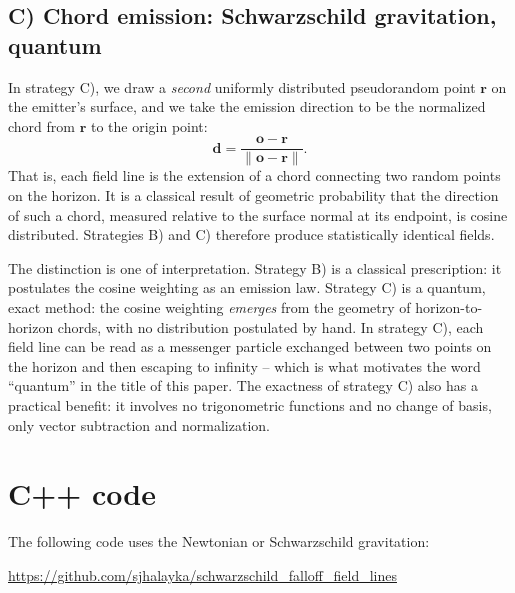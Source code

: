 \documentclass[10pt]{article}
\begin{document}
\subsection{C) Chord emission: Schwarzschild gravitation, quantum}

In strategy C), we draw a {\em second} uniformly distributed pseudorandom point $\mathbf{r}$ on the emitter's surface, and we take the emission direction to be the normalized chord from $\mathbf{r}$ to the origin point:
\begin{equation}
\mathbf{d} = \frac{\mathbf{o} - \mathbf{r}}{\lVert \mathbf{o} - \mathbf{r} \rVert}.
\end{equation}
That is, each field line is the extension of a chord connecting two random points on the horizon.
It is a classical result of geometric probability that the direction of such a chord, measured relative to the surface normal at its endpoint, is cosine distributed.
Strategies B) and C) therefore produce statistically identical fields.

The distinction is one of interpretation.
Strategy B) is a classical prescription: it postulates the cosine weighting as an emission law.
Strategy C) is a quantum, exact method: the cosine weighting {\em emerges} from the geometry of horizon-to-horizon chords, with no distribution postulated by hand.
In strategy C), each field line can be read as a messenger particle exchanged between two points on the horizon and then escaping to infinity -- which is what motivates the word ``quantum'' in the title of this paper.
The exactness of strategy C) also has a practical benefit: it involves no trigonometric functions and no change of basis, only vector subtraction and normalization.




\section{C++ code}
\label{sec:code}

The following code uses the Newtonian or Schwarzschild gravitation:

\url{https://github.com/sjhalayka/schwarzschild_falloff_field_lines}
\end{document}
